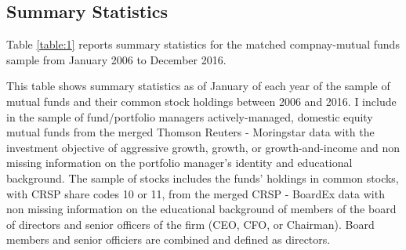 \documentclass[11pt]{article}
\begin{document}
\begin{doublespace}
\subsection{Summary Statistics}
Table \ref{table:1} reports summary statistics for the matched compnay-mutual funds sample from January 2006 to December 2016.  

  This table shows summary statistics as of January of each year of the sample of mutual funds and their common stock holdings between 2006 and 2016. I include in the sample of fund/portfolio managers actively-managed, domestic equity mutual funds from the merged Thomson Reuters - Moringstar data with the investment objective of aggressive growth, growth, or growth-and-income and non missing information on the portfolio manager's identity and educational background. The sample of stocks includes the funds' holdings in common stocks, with CRSP share codes 10 or 11, from the merged CRSP - BoardEx data with non missing information on the educational background of members of the board of directors and senior officers of the firm (CEO, CFO, or Chairman). Board members and senior officiers are combined and defined as directors.



\end{doublespace}
\end{document}
